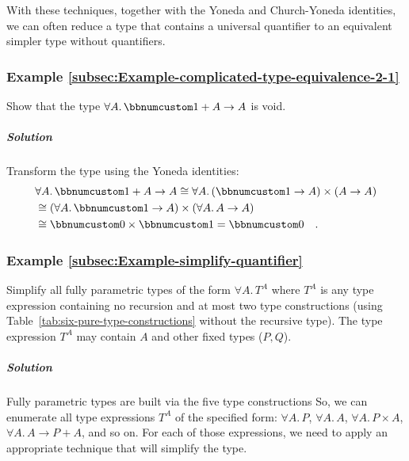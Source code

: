 With these techniques, together with the Yoneda and Church-Yoneda
identities, we can often reduce a type that contains a universal quantifier
to an equivalent simpler type without quantifiers.

\subsubsection{Example \label{subsec:Example-complicated-type-equivalence-2-1}\ref{subsec:Example-complicated-type-equivalence-2-1}}

Show that the type $\forall A.\,\bbnum 1+A\rightarrow A$ is void.

\subparagraph{Solution}

Transform the type using the Yoneda identities:
\begin{align*}
 & \forall A.\,\bbnum 1+A\rightarrow A\cong\forall A.\,(\bbnum 1\rightarrow A)\times(A\rightarrow A)\\
 & \cong(\forall A.\,\bbnum 1\rightarrow A)\times(\forall A.\,A\rightarrow A)\\
 & \cong\bbnum 0\times\bbnum 1=\bbnum 0\quad.
\end{align*}


\subsubsection{Example \label{subsec:Example-simplify-quantifier}\ref{subsec:Example-simplify-quantifier}}

Simplify all fully parametric types of the form $\forall A.\,T^{A}$
where $T^{A}$ is any type expression containing no recursion and
at most two type constructions (using Table~\ref{tab:six-pure-type-constructions}
without the recursive type). The type expression $T^{A}$ may contain
$A$ and other fixed types ($P,$$Q$).

\subparagraph{Solution}

Fully parametric types are built via the five type constructions So,
we can enumerate all type expressions $T^{A}$ of the specified form:
$\forall A.\,P$, $\forall A.\,A$, $\forall A.\,P\times A$, $\forall A.\,A\rightarrow P+A$,
and so on. For each of those expressions, we need to apply an appropriate
technique that will simplify the type.

